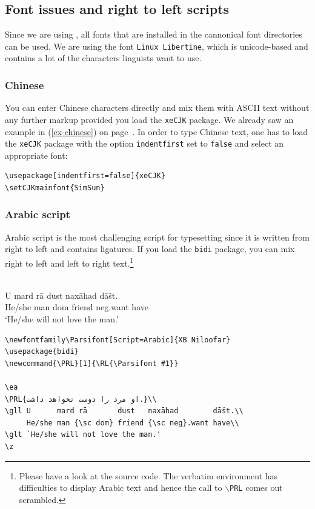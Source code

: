 \subsection{Font issues and right to left scripts}

Since we are using \xelatex, all fonts that are installed in the cannonical font directories can be
used. We are using the font \texttt{Linux Libertine}, which is unicode-based and contains a lot of
the characters linguists want to use.

\subsubsection{Chinese}
\label{sec-Chinese}

You can enter Chinese characters directly and mix them with ASCII text without any further markup
provided you load the \texttt{xeCJK} package. We already saw an example in (\ref{ex-chinese}) on
page~\pageref{ex-chinese}. In order to type Chinese text, one has to load the \texttt{xeCJK} package
with the option \verb+indentfirst+ set to \verb+false+ and select an appropriate font:
\begin{verbatim}
\usepackage[indentfirst=false]{xeCJK}
\setCJKmainfont{SimSun}
\end{verbatim}


\subsubsection{Arabic script}

Arabic script is the most challenging script for typesetting since it is written from right to left
and contains ligatures. If you load the \texttt{bidi} package, you can mix right to left and left to
right text.\footnote{
  Please have a look at the source code. The verbatim environment has difficulties to display Arabic
  text and hence the call to \texttt{$\backslash$PRL} comes out scrambled.
}

\ea
{}\\
 \gll U      mard rā        dust   naxāhad        dāšt.\\
      He/she man  {\sc dom} friend {\sc neg}.want have\\
\glt `He/she will not love the man.'
\z

\begin{verbatim}
\newfontfamily\Parsifont[Script=Arabic]{XB Niloofar}
\usepackage{bidi}
\newcommand{\PRL}[1]{\RL{\Parsifont #1}}

\ea
\PRL{او مرد را دوست نخواهد داشت.}\\
\gll U      mard rā       dust   naxāhad        dāšt.\\
     He/she man {\sc dom} friend {\sc neg}.want have\\
\glt `He/she will not love the man.'
\z
\end{verbatim}

